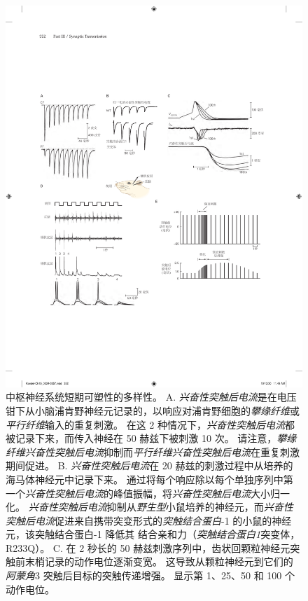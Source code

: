\begin{figure}[htbp]
	\centering
	\includegraphics[width=0.9\linewidth]{chap15/fig_15_15}
	\caption{中枢神经系统短期可塑性的多样性。
		A. \textit{兴奋性突触后电流}是在电压钳下从小脑浦肯野神经元记录的，以响应对浦肯野细胞的\textit{攀缘纤维}或\textit{平行纤维}输入的重复刺激。
		在这 2 种情况下，\textit{兴奋性突触后电流}都被记录下来，而传入神经在 50 赫兹下被刺激 10 次。
		请注意，\textit{攀缘纤维}\textit{兴奋性突触后电流}抑制而\textit{平行纤维}\textit{兴奋性突触后电流}在重复刺激期间促进\cite{dittman2000interplay}。
		B. \textit{兴奋性突触后电流}在 20 赫兹的刺激过程中从培养的海马体神经元中记录下来。
		通过将每个响应除以每个单独序列中第一个\textit{兴奋性突触后电流}的峰值振幅，将\textit{兴奋性突触后电流}大小归一化。
		\textit{兴奋性突触后电流}抑制从\textit{野生型}小鼠培养的神经元，而\textit{兴奋性突触后电流}促进来自携带突变形式的\textit{突触结合蛋白}-1 的小鼠的神经元，该突触结合蛋白-1 降低其  结合亲和力（\textit{突触结合蛋白1}突变体，R233Q）\cite{fernandez2001synaptotagmin}。
		C. 在 2 秒长的 50 赫兹刺激序列中，齿状回颗粒神经元突触前末梢记录的动作电位逐渐变宽。
		这导致从颗粒神经元到它们的\textit{阿蒙角}3 突触后目标的突触传递增强。
		显示第 1、25、50 和 100 个动作电位。
}
\end{figure}
